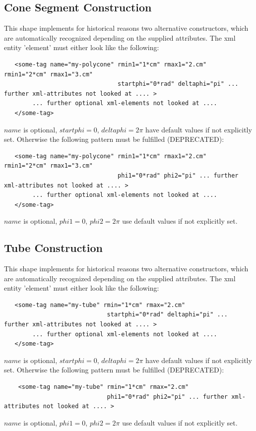 \subsection{Cone Segment Construction}
\label{sec:dd4hep-manual-plugin-cone-segment-shape}

This shape implements for historical reasons two alternative constructors,
which are automatically recognized depending on the supplied attributes.
The xml entity 'element' must either look like the following:
\begin{verbatim}
   <some-tag name="my-polycone" rmin1="1*cm" rmax1="2.cm"  rmin1="2*cm" rmax1="3.cm" 
                                startphi="0*rad" deltaphi="pi" ... further xml-attributes not looked at .... >
        ... further optional xml-elements not looked at .... 
   </some-tag>
\end{verbatim}
$name$ is optional, $startphi=0$, $deltaphi=2\pi$ have default values if not explicitly set.
Otherwise the following pattern must be fulfilled (DEPRECATED):
\begin{verbatim}
   <some-tag name="my-polycone" rmin1="1*cm" rmax1="2.cm"  rmin1="2*cm" rmax1="3.cm" 
                                phi1="0*rad" phi2="pi" ... further xml-attributes not looked at .... >
        ... further optional xml-elements not looked at .... 
   </some-tag>
\end{verbatim}
$name$ is optional, $phi1=0$, $phi2=2\pi$ use default values if not explicitly set.


\subsection{Tube Construction}
\label{sec:dd4hep-manual-plugin-tube-shape}

This shape implements for historical reasons two alternative constructors,
which are automatically recognized depending on the supplied attributes.
The xml entity 'element' must either look like the following:
\begin{verbatim}
   <some-tag name="my-tube" rmin="1*cm" rmax="2.cm" 
                             startphi="0*rad" deltaphi="pi" ... further xml-attributes not looked at .... >
        ... further optional xml-elements not looked at .... 
   </some-tag>
\end{verbatim}
$name$ is optional, $startphi=0$, $deltaphi=2\pi$ have default values if not explicitly set.
Otherwise the following pattern must be fulfilled (DEPRECATED):
\begin{verbatim}
    <some-tag name="my-tube" rmin="1*cm" rmax="2.cm" 
                             phi1="0*rad" phi2="pi" ... further xml-attributes not looked at .... >
\end{verbatim}
$name$ is optional, $phi1=0$, $phi2=2\pi$ use default values if not explicitly set.

